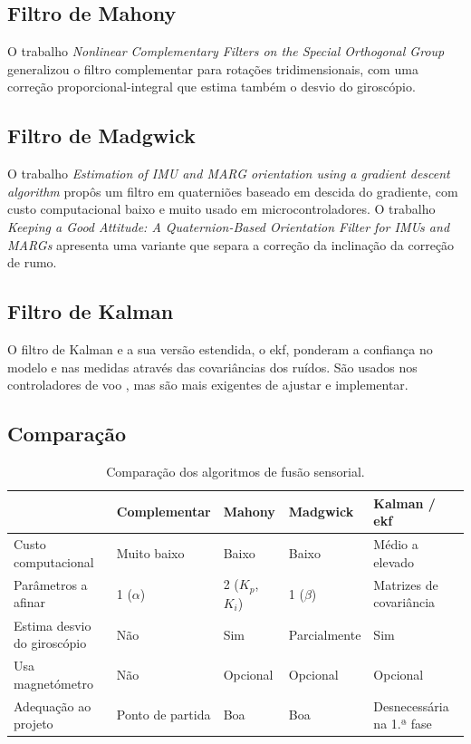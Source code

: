 \subsection{Filtro de Mahony}
O trabalho \textit{Nonlinear Complementary Filters on the Special Orthogonal Group} \cite{mahony2008} generalizou o filtro complementar para rotações tridimensionais, com uma correção proporcional-integral que estima também o desvio do giroscópio.

\subsection{Filtro de Madgwick}
O trabalho \textit{Estimation of IMU and MARG orientation using a gradient descent algorithm} \cite{madgwick2011} propôs um filtro em quaterniões baseado em descida do gradiente, com custo computacional baixo e muito usado em microcontroladores. O trabalho \textit{Keeping a Good Attitude: A Quaternion-Based Orientation Filter for IMUs and MARGs} \cite{valenti2015} apresenta uma variante que separa a correção da inclinação da correção de rumo.

\subsection{Filtro de Kalman}
O filtro de Kalman \cite{kalman1960} e a sua versão estendida, o \gls{ekf}, ponderam a confiança no modelo e nas medidas através das covariâncias dos ruídos. São usados nos controladores de voo \cite{px4ctrl}, mas são mais exigentes de ajustar e implementar.

\subsection{Comparação}
\begin{table}[H]
\centering\small
\caption{Comparação dos algoritmos de fusão sensorial.}
\begin{tabularx}{\textwidth}{>{\raggedright\arraybackslash}p{2.6cm}YYYY}
\toprule
 & Complementar & Mahony & Madgwick & Kalman / \acrshort{ekf}\\\midrule
Custo computacional & Muito baixo & Baixo & Baixo & Médio a elevado\\
Parâmetros a afinar & 1 ($\alpha$) & 2 ($K_p$, $K_i$) & 1 ($\beta$) & Matrizes de covariância\\
Estima desvio do giroscópio & Não & Sim & Parcialmente & Sim\\
Usa magnetómetro & Não & Opcional & Opcional & Opcional\\
Adequação ao projeto & Ponto de partida & Boa & Boa & Desnecessária na 1.ª fase\\
\bottomrule
\end{tabularx}
\label{tab:fusao}
\end{table}

